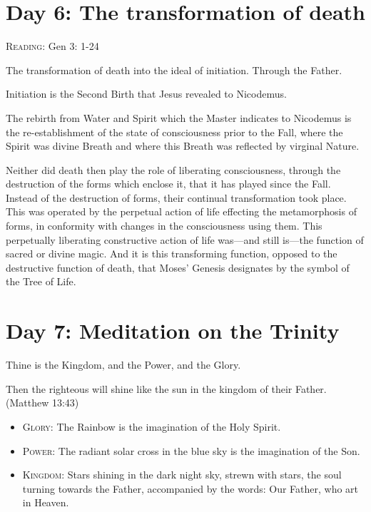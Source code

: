 \section{Day 6: The transformation of death}

\textsc{Reading}: Gen 3: 1-24

The transformation of death into the ideal of initiation. Through the Father.

Initiation is the Second Birth that Jesus revealed to Nicodemus.

\begin{quotex}
The rebirth from Water and Spirit which the Master indicates to Nicodemus is the re-establishment of the state of consciousness prior to the Fall, where the Spirit was divine Breath and where this Breath was reflected by virginal Nature. 

Neither did death then play the role of liberating consciousness, through the destruction of the forms which enclose it, that it has played since the Fall. Instead of the destruction of forms, their continual transformation took place. This was operated by the perpetual action of life effecting the metamorphosis of forms, in conformity with changes in the consciousness using them. This perpetually liberating constructive action of life was—and still is—the function of sacred or divine magic. And it is this transforming function, opposed to the destructive function of death, that Moses' Genesis designates by the symbol of the Tree of Life.

\end{quotex}

\section{Day 7: Meditation on the Trinity}

Thine is the Kingdom, and the Power, and the Glory.

Then the righteous will shine like the sun in the kingdom of their Father. (Matthew 13:43)

\begin{itemize}

\item \textsc{Glory}: The Rainbow is the imagination of the Holy Spirit.

\item \textsc{Power}: The radiant solar cross in the blue sky is the imagination of the Son.

\item \textsc{Kingdom}: Stars shining in the dark night sky, strewn with stars, the soul turning towards the Father, accompanied by the words: Our Father, who art in Heaven.
\end{itemize}


